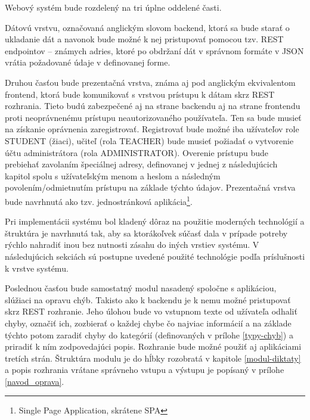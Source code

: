 \documentclass[12pt,oneside]{fithesis2}
\begin{document}
    \par Webový systém bude rozdelený na tri úplne oddelené časti.

\par Dátovú vrstvu, označovaná anglickým slovom backend, ktorá sa bude starať o ukladanie dát a navonok bude možné k nej pristupovať pomocou tzv. REST endpointov – známych adries, ktoré po obdržaní dát v správnom formáte v JSON vrátia požadované údaje v definovanej forme.
	\par Druhou časťou bude prezentačná vrstva, známa aj pod anglickým ekvivalentom frontend, ktorá bude komunikovať s vrstvou prístupu k dátam skrz REST rozhrania. Tieto budú zabezpečené aj na strane backendu aj na strane frontendu proti neoprávnenému prístupu neautorizovaného používateľa. Ten sa bude musieť na získanie oprávnenia zaregistrovať. Registrovať bude možné iba užívateľov role STUDENT (žiaci), učiteľ (rola TEACHER) bude musieť požiadať o vytvorenie účtu administrátora (rola ADMINISTRATOR). Overenie prístupu bude prebiehať zavolaním špeciálnej adresy, definovanej v jednej z následujúcich kapitol spolu s užívateľským menom a heslom a následným povolením/odmietnutím prístupu na základe týchto údajov. Prezentačná vrstva bude navrhnutá ako tzv. jednostránková aplikácia\footnote{Single Page Application, skrátene SPA}.
	    \par Pri implementácii systému bol kladený dôraz na použitie moderných technológií a štruktúra je navrhnutá tak, aby sa ktorákoľvek súčasť dala v prípade potreby rýchlo nahradiť inou bez nutnosti zásahu do iných vrstiev systému. V následujúcich sekciách sú postupne uvedené použité technológie podľa príslušnosti k vrstve systému.
	    \par Poslednou časťou bude samostatný modul nasadený spoločne s aplikáciou, slúžiaci na opravu chýb. Takisto ako k backendu je k nemu možné pristupovať skrz REST rozhranie. Jeho úlohou bude vo vstupnom texte od užívateľa odhaliť chyby, označiť ich, zozbierať o každej chybe čo najviac informácií a na základe týchto potom zaradiť chyby do kategórií (definovaných v prílohe \ref{typy-chyb}) a priradiť k ním zodpovedajúci popis. Rozhranie bude možné použiť aj aplikáciami tretích strán. Štruktúra modulu je do hĺbky rozobratá v kapitole \ref{modul-diktaty} a popis rozhrania vrátane správneho vstupu a výstupu je popísaný v prílohe \ref{navod_oprava}.
	    
	\pagebreak
\end{document}

